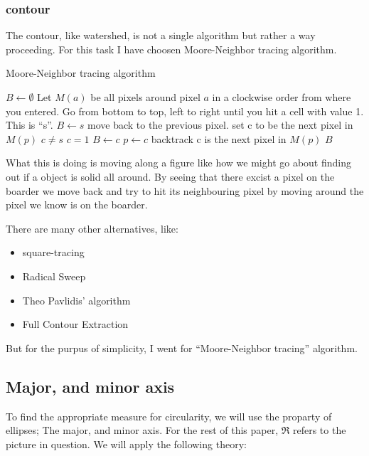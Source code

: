 \documentclass{article}
\begin{document}
\subsubsection{contour}
The contour, like watershed, is not a single algorithm but rather a way proceeding. For this task I have choosen Moore-Neighbor tracing algorithm\cite{ghuneim_contour_2000}.
\begin{algorithm}
\caption{Moore-Neighbor tracing algorithm}
\begin{codebox}
\li $B \gets \emptyset$
\li Let $M(a)$ be all pixels around pixel $a$ in a 
clockwise order from where you entered.
\li Go from bottom to top, left to right 
until you hit a cell with value 1. This is “s”.
\li $B \leftarrow s$
\li move back to the previous pixel.
\li set c to be the next pixel in $M(p)$
\li \While $c \neq s$ \Do
\li \If $c = 1$ \Do 
\li $B \leftarrow c$
\li $p \gets c$
\li backtrack
\li \Else
\li c is the next pixel in $M(p)$
\End
\End
\li \Return $B$
\end{codebox}
\end{algorithm}
What this is doing is moving along a figure like how we might go about finding out if a object is solid all around. By seeing that there excist a pixel on the boarder we move back and try to hit its neighbouring pixel by moving around the pixel we know is on the boarder.

There are many other alternatives, like:
\begin{itemize}
\item square-tracing
\item Radical Sweep
\item Theo Pavlidis' algorithm
\item Full Contour Extraction\cite{shin_efficient_2008}
\end{itemize}

But for the purpus of simplicity, I went for “Moore-Neighbor tracing” algorithm.

\subsection{Major, and minor axis}
To find the appropriate measure for circularity, we will use the proparty of ellipses; The major, and minor axis. For the rest of this paper, $\Re$ refers to the picture in question. We will apply the following theory:
\end{document}
